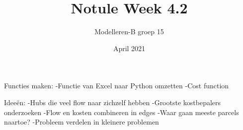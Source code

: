 \documentclass{article}
\title{Notule Week 4.2}
\author{Modelleren-B groep 15}
\date{April 2021}
\begin{document}
Functies maken:
-Functie van Excel naar Python omzetten
-Cost function

Ideeën:
-Hubs die veel flow naar zichzelf hebben
-Grootste kostbepalers onderzoeken
-Flow en kosten combineren in edges
-Waar gaan meeste parcels naartoe?
-Probleem verdelen in kleinere problemen 
\end{document}
